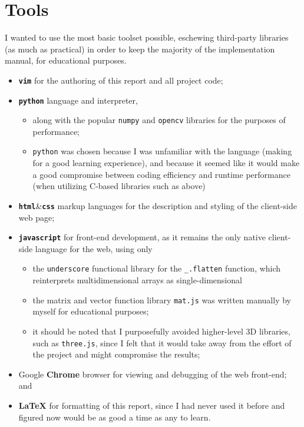 \section{Tools}
I wanted to use the most basic toolset possible, eschewing third-party libraries (as much as practical) in order to keep the majority of the implementation manual, for educational purposes.
\begin{itemize}
\item \textbf{\texttt{vim}} for the authoring of this report and all project code;
\item \textbf{\texttt{python}} language and interpreter,
    \begin{itemize}
    \item along with the popular \verb!numpy! and \verb!opencv! libraries for the purposes of performance;
    \item \verb!python! was chosen because I was unfamiliar with the language (making for a good learning experience), and because it seemed like it would make a good compromise between coding efficiency and runtime performance (when utilizing C-based libraries such as above)
    \end{itemize}
\item \textbf{\texttt{html}}\&\textbf{\texttt{css}} markup languages for the description and styling of the client-side web page;
\item \textbf{\texttt{javascript}} for front-end development, as it remains the only native client-side language for the web, using only
    \begin{itemize}
    \item the \verb!underscore! functional library for the \verb!_.flatten! function, which reinterprets multidimensional arrays as single-dimensional
    \item the matrix and vector function library \verb!mat.js! was written manually by myself for educational purposes;
    \item it should be noted that I purposefully avoided higher-level 3D libraries, such as \verb!three.js!, since I felt that it would take away from the effort of the project and might compromise the results;
    \end{itemize}
\item Google \textbf{Chrome} browser for viewing and debugging of the web front-end; and
\item \textbf{\LaTeX} for formatting of this report, since I had never used it before and figured now would be as good a time as any to learn.
\end{itemize}
